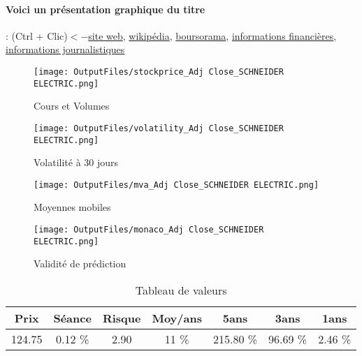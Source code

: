 \documentclass[11pt,a4paper]{report}%
\begin{document}
\paragraph{Voici un présentation graphique du titre} : (Ctrl + Clic)$<-$\href{https://infra.schneider-electric.co.in/investor}{site web}, \href{https://fr.wikipedia.org/wiki/Schneider_Electric}{wikipédia}, \href{https://www.boursorama.com/cours/1rPSU}{boursorama}, \href{https://www.qwant.com/?q=site:https:%2f%2fwww.easybourse.com%2faction-societe%2fSCHNEIDER-ELECTRIC&t=web&client=ext-firefox-hp}{informations financières}, \href{https://bourse.lerevenu.com/cours-de-bourse/fiche-valeur-synthese/SCHNEIDER-ELECTRIC/SU-FR}{informations journalistiques}
\begin{figure}[!htb]
   \begin{minipage}{0.5\textwidth}
     \centering
     \texttt{[image: OutputFiles/stockprice\_Adj Close\_SCHNEIDER ELECTRIC.png]}
     \caption{Cours et Volumes}\label{Fig:price_SCHNEIDER ELECTRIC}
   \end{minipage}\hfill
   \begin{minipage}{0.5\textwidth}
     \centering
     \texttt{[image: OutputFiles/volatility\_Adj Close\_SCHNEIDER ELECTRIC.png]}
     \caption{Volatilité à 30 jours}\label{Fig:volat_SCHNEIDER ELECTRIC}
   \end{minipage}
\end{figure}
\begin{figure}[!htb]
   \begin{minipage}{0.5\textwidth}
     \centering
     \texttt{[image: OutputFiles/mva\_Adj Close\_SCHNEIDER ELECTRIC.png]}
     \caption{Moyennes mobiles}\label{Fig:mva_SCHNEIDER ELECTRIC}
   \end{minipage}\hfill
   \begin{minipage}{0.5\textwidth}
     \centering
     \texttt{[image: OutputFiles/monaco\_Adj Close\_SCHNEIDER ELECTRIC.png]}
     \caption{Validité de prédiction}\label{Fig:prediction_SCHNEIDER ELECTRIC}
   \end{minipage}
\end{figure}

\begin{table}[H]
  \centering
    \begin{tabular}{|c|c|c|c|c|c|c|}
    \hline
    Prix & Séance & Risque  & Moy/ans & 5ans & 3ans & 1ans \\
    \hline
    124.75 &    0.12 \%    & 2.90 & 11 \% & 215.80 \% & 96.69 \% & 2.46 \% \\
    \hline
    \end{tabular}%
        \label{tab:table_SCHNEIDER ELECTRIC}%
      \caption{Tableau de valeurs}
\end{table}%
\end{document}
